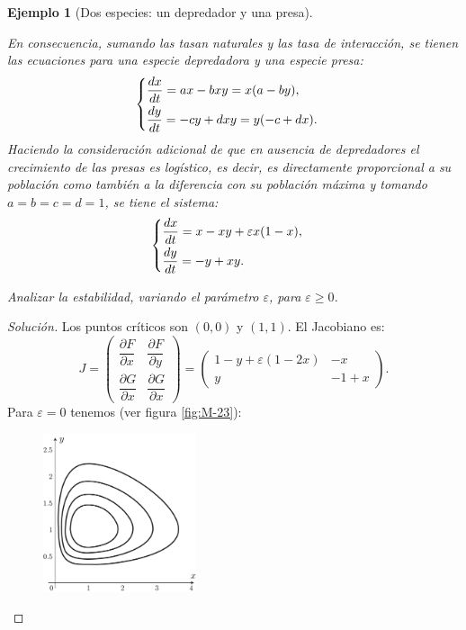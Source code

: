 \documentclass[a5paper,doc,10pt,noapacite]{apa6}
\newtheorem{ejem}{Ejemplo}
\begin{document}
{{\begin{ejem}[Dos especies: un depredador y una presa]
\begin{APAitemize}
		En consecuencia, sumando las tasan naturales y las tasa de interacción, se tienen las ecuaciones para una especie depredadora y una especie presa:
		\[
		\begin{cases}
		\dfrac{dx}{dt}=ax-bxy=x(a-by)  ,	\vspace{0.3em}
		\\
		\dfrac{dy}{dt}=-cy+dxy=y(-c+dx).
	\end{cases}
		\]
		Haciendo la consideración adicional de que en ausencia de depredadores el crecimiento de las presas es
		logístico, es decir, es directamente proporcional a su población como también a la diferencia con su población máxima y tomando \(a=b=c=d=1\), se tiene el sistema:
		\[
		\begin{cases}
		\dfrac{dx}{dt}=x-xy+\varepsilon x(1-x),	\vspace{0.3em}
		\\
		\dfrac{dy}{dt}=-y+xy.
	\end{cases}
		\]
	\end{APAitemize}
	Analizar la estabilidad, variando el parámetro \(\varepsilon\), para \(\varepsilon\geq 0\).
\end{ejem}
\begin{proof}[Solución]
		Los puntos críticos son \((0,0)\) y \((1,1)\). El Jacobiano es:
		\[
			J=\begin{pmatrix} \dfrac{\partial F}{\partial x} & \dfrac{\partial F}{\partial y} \\ \dfrac{\partial G}{\partial x} & \dfrac{\partial G}{\partial x}\end{pmatrix}=\begin{pmatrix} 1-y+\varepsilon(1-2x) & -x \\ y & -1+x\end{pmatrix}.
		\]
		Para \(\varepsilon=0\) tenemos (ver figura \ref{fig:M-23}):
		\vspace{-1\baselineskip}
	\begin{figure}[H]
		\captionsetup{justification=centering, labelfont=footnotesize, font=footnotesize}
		\centering
		\includegraphics[width=4.5cm]{Graficos/figura23}
	

\end{figure}
\end{proof}}}
\end{document}
